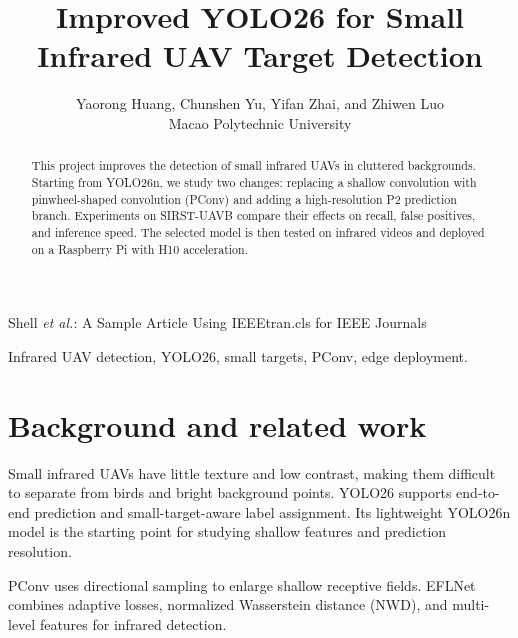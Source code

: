 \documentclass[lettersize,journal]{IEEEtran}
\begin{document}
\title{Improved YOLO26 for Small Infrared UAV Target Detection}

\author{Yaorong Huang, Chunshen Yu, Yifan Zhai, and Zhiwen Luo\\Macao Polytechnic University}

%
{Shell \MakeLowercase{\textit{et al.}}: A Sample Article Using IEEEtran.cls for IEEE Journals}


\maketitle

\begin{abstract}
This project improves the detection of small infrared UAVs in cluttered backgrounds. Starting from YOLO26n, we study two changes: replacing a shallow convolution with pinwheel-shaped convolution (PConv) and adding a high-resolution P2 prediction branch. Experiments on SIRST-UAVB compare their effects on recall, false positives, and inference speed. The selected model is then tested on infrared videos and deployed on a Raspberry Pi with H10 acceleration.
\end{abstract}

\begin{IEEEkeywords}
Infrared UAV detection, YOLO26, small targets, PConv, edge deployment.
\end{IEEEkeywords}

\section{Background and related work}
Small infrared UAVs have little texture and low contrast, making them difficult to separate from birds and bright background points. YOLO26 supports end-to-end prediction and small-target-aware label assignment. Its lightweight YOLO26n model is the starting point for studying shallow features and prediction resolution\cite{jocher2026yolo26,ultralytics2026docs}.

PConv uses directional sampling to enlarge shallow receptive fields\cite{yang2025pconv}. EFLNet combines adaptive losses, normalized Wasserstein distance (NWD), and multi-level features for infrared detection\cite{yang2024eflnet}.
\end{document}
